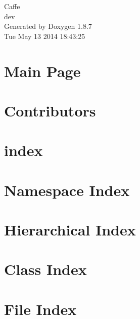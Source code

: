 \documentclass[twoside]{book}
\newcommand{\+}{\discretionary{\mbox{\scriptsize$\hookleftarrow$}}{}{}}
\newcommand{\clearemptydoublepage}{%
  \newpage{\pagestyle{empty}\cleardoublepage}%
}
\begin{document}
\hypersetup{pageanchor=false,
             bookmarks=true,
             bookmarksnumbered=true,
             pdfencoding=unicode
            }
\begin{titlepage}
\vspace*{7cm}
\begin{center}%
{\Large Caffe \\[1ex]\large dev }\\
\vspace*{1cm}
{\large Generated by Doxygen 1.8.7}\\
\vspace*{0.5cm}
{\small Tue May 13 2014 18:43:25}\\
\end{center}
\end{titlepage}
\clearemptydoublepage
\tableofcontents
\clearemptydoublepage
{}
\hypersetup{pageanchor=true}

\chapter{Main Page}
\label{index}\hypertarget{index}{}
\chapter{Contributors}
\label{md__c_o_n_t_r_i_b_u_t_o_r_s}
\hypertarget{md__c_o_n_t_r_i_b_u_t_o_r_s}{}

\chapter{index}
\label{md_docs_index}
\hypertarget{md_docs_index}{}

\chapter{Namespace Index}

\chapter{Hierarchical Index}

\chapter{Class Index}

\chapter{File Index}

\end{document}
